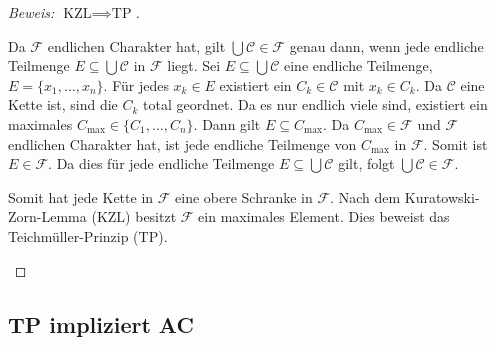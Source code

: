 \begin{proof}[Beweis: $\text{KZL} \implies \text{TP}$]
\begin{math-stroke}
Da $\mathcal{F}$ endlichen Charakter hat, gilt $\bigcup \mathcal{C} \in \mathcal{F}$ genau dann, wenn jede endliche Teilmenge $E \subseteq \bigcup \mathcal{C}$ in $\mathcal{F}$ liegt.
Sei $E \subseteq \bigcup \mathcal{C}$ eine endliche Teilmenge, $E = \{x_1, \dots, x_n\}$.
Für jedes $x_k \in E$ existiert ein $C_k \in \mathcal{C}$ mit $x_k \in C_k$.
Da $\mathcal{C}$ eine Kette ist, sind die $C_k$ total geordnet. Da es nur endlich viele sind, existiert ein maximales $C_{\text{max}} \in \{C_1, \dots, C_n\}$.
Dann gilt $E \subseteq C_{\text{max}}$.
Da $C_{\text{max}} \in \mathcal{F}$ und $\mathcal{F}$ endlichen Charakter hat, ist jede endliche Teilmenge von $C_{\text{max}}$ in $\mathcal{F}$.
Somit ist $E \in \mathcal{F}$.
Da dies für jede endliche Teilmenge $E \subseteq \bigcup \mathcal{C}$ gilt, folgt $\bigcup \mathcal{C} \in \mathcal{F}$.

Somit hat jede Kette in $\mathcal{F}$ eine obere Schranke in $\mathcal{F}$.
Nach dem Kuratowski-Zorn-Lemma ($\text{KZL}$) besitzt $\mathcal{F}$ ein maximales Element.
Dies beweist das Teichmüller-Prinzip ($\text{TP}$).
\end{math-stroke}
\end{proof}

\begin{ai-global-state-checkpoint-invisible-content}
\end{ai-global-state-checkpoint-invisible-content}

\subsection{TP impliziert AC}

